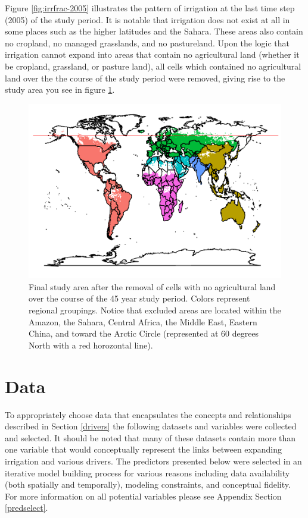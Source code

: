 \documentclass[12pt,twoside]{reedthesis}
\begin{document}
Figure \ref{fig:irrfrac-2005} illustrates the pattern of irrigation at the last time step (2005) of the study period. It is notable that irrigation does not exist at all in some places such as the higher latitudes and the Sahara. These areas also contain no cropland, no managed grasslands, and no pastureland. Upon the logic that irrigation cannot expand into areas that contain no agricultural land (whether it be cropland, grassland, or pasture land), all cells which contained no agricultural land over the the course of the study period were removed, giving rise to the study area you see in figure \ref{fig:study-region-nocrop}.
\begin{figure}

{\centering \includegraphics{thesis_files/figure-latex/study-region-nocrop-1} 

}

\caption[Study Area]{Final study area after the removal of cells with no agricultural land over the course of the 45 year study period. Colors represent regional groupings. Notice that excluded areas are located within the Amazon, the Sahara, Central Africa, the Middle East, Eastern China, and toward the Arctic Circle (represented at 60 degrees North with a red horozontal line). }\label{fig:study-region-nocrop}
\end{figure}
\hypertarget{data}{%
\section{Data}\label{data}}

To appropriately choose data that encapsulates the concepts and relationships described in Section \ref{drivers} the following datasets and variables were collected and selected. It should be noted that many of these datasets contain more than one variable that would conceptually represent the links between expanding irrigation and various drivers. The predictors presented below were selected in an iterative model building process for various reasons including data availability (both spatially and temporally), modeling constraints, and conceptual fidelity. For more information on all potential variables please see Appendix Section \ref{predselect}.
\end{document}

